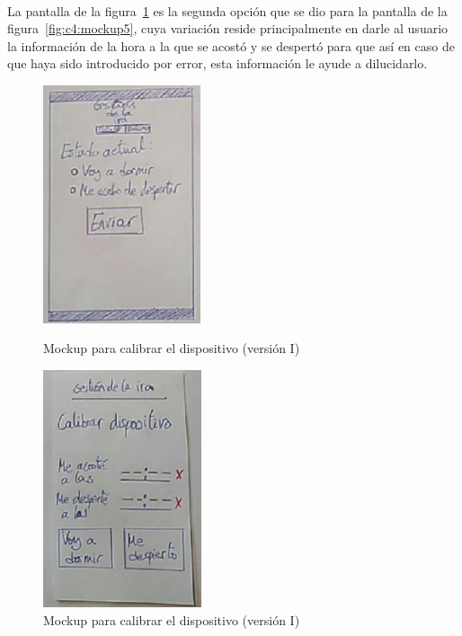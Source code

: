 \paragraph{}
La pantalla de la figura~\ref{fig:c4:mockup6} es la segunda opción que se dio para la pantalla de la figura~\ref{fig:c4:mockup5}, cuya variación reside principalmente en darle al usuario la información de la hora a la que se acostó y se despertó para que así en caso de que haya sido introducido por error, esta información le ayude a dilucidarlo.

\begin{figure}[h]
    \centering
    \begin{minipage}{.4\textwidth}
        \centering
        \includegraphics[width=0.8\linewidth, height=7cm]{Imagenes/anxA1-3.png}
        \caption[Mockup para calibrar el dispositivo (versión I)]{Mockup para calibrar el dispositivo (versión I)}
        \label{fig:c4:mockup5}
    \end{minipage}
    \hfill\vline\hfill
    \begin{minipage}{.4\textwidth}
        \centering
        \includegraphics[width=0.8\linewidth, height=7cm]{Imagenes/anxA1-6.png}
        \caption[Mockup para calibrar el dispositivo (versión I)]{Mockup para calibrar el dispositivo (versión I)}
        \label{fig:c4:mockup6}
    \end{minipage}
\end{figure}


